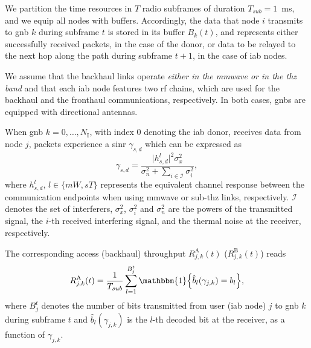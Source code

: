 We partition the time resources in $T$ radio subframes of duration $T_{sub} = 1$~ms, and we equip all nodes with buffers. Accordingly, the data that node $i$ transmits to \gls{gnb} $k$ during subframe $t$ is stored in its buffer $B_k (t)$, and represents either successfully received packets, in the case of the donor, or data to be relayed to the next hop along the path during subframe $t + 1$, in the case of \gls{iab} nodes.

We assume that the backhaul links operate \textit{either in the \gls{mmwave} or in the \gls{thz} band} and that each \gls{iab} node features two \gls{rf} chains, which are used for the backhaul and the fronthaul communications, respectively. In both cases, \glspl{gnb} are equipped with directional antennas.

When \gls{gnb} $k = 0, \ldots, N_{\mathrm{I}}$, with index $0$ denoting the \gls{iab} donor, receives data from node $j$, packets experience a \gls{sinr} $\gamma_{s, d}$ which can be expressed as
\begin{equation}
\label{eq:sinr_common}
    \gamma_{s, d} = \frac{ \vert h_{s, d}^{l} \vert^2 \sigma_{x}^2 }{\sigma_{n}^2 + \sum_{i \in \mathcal{I}} \sigma_{i}^ 2}, 
\end{equation}
where $h_{s, d}^{l}, \, l \in \{mW, sT\} $ represents the equivalent channel response between the communication endpoints when using \gls{mmwave} or sub-\gls{thz} links, respectively. $\mathcal{I}$ denotes the set of interferers, $\sigma_{x}^2$, $\sigma_{i}^2$ and $\sigma_{n}^2$ are the powers of the transmitted signal, the $i$-th received interfering signal, and the thermal noise at the receiver, respectively. 

The corresponding access (backhaul) throughput $R_{j, k}^{\mathrm{A}} (t)$ ($R_{j, k}^{\mathrm{B}} (t)$) reads
\begin{equation}
  R_{j, k}^{\mathrm{A}} (t) = \frac{1}{T_{sub}} \sum_{l=1}^{B_{j}^t} \mathbbm{1} \left\{ \hat{b}_{l} (\gamma_{j, k}) = b_l \right\} ,
\end{equation}
where $B_{j}^t$ denotes the number of bits transmitted from user (\gls{iab} node) $j$ to \gls{gnb} $k$ during subframe $t$ and %
$\hat{b}_{l} (\gamma_{j, k})$ is the $l$-th decoded bit at the receiver, as a function of $\gamma_{j, k}$.

